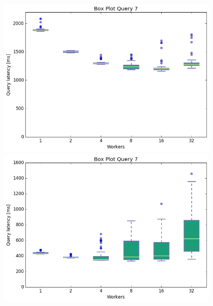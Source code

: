 \documentclass[11pt,singlecolumn]{scrartcl}
\begin{document}
\begin{figure}[!tbp]
  \centering
  \RawFloats
  \begin{minipage}[b]{0.5\textwidth}
    \includegraphics[width=\textwidth]{boxesfl/q7}
  \end{minipage}
  \hfill
  \begin{minipage}[b]{0.5\textwidth}
    \includegraphics[width=\textwidth]{boxesfs/q7}
  \end{minipage}
\end{figure}
\end{document}
